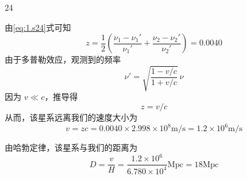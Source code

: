 \begin{solution}{24}
\begin{subsolution}
    \end{subsolution}
    \begin{subsolution}
        由\eqref{eq:1.s24}式可知
        \begin{equation}
            z = \frac{1}{2}\left(\frac{\nu_1 - \nu_1'}{\nu_1'} + \frac{\nu_2 - \nu_2'}{\nu_2'}\right) = 0.0040
            \label{eq:6.s24}
        \end{equation}
        由于多普勒效应，观测到的频率
        \begin{equation*}
            \nu' = \sqrt{\frac{1 - v/c}{1 + v/c}}\,\nu
        \end{equation*}
        因为 $v \ll c$，推导得
        \begin{equation*}
            z = v/c
        \end{equation*}
        从而，该星系远离我们的速度大小为
        \begin{equation}
            v = zc = 0.0040 \times 2.998 \times 10^8 \mathrm{m/s} = 1.2 \times 10^6 \mathrm{m/s}
            \label{eq:7.s24}
        \end{equation}
    \end{subsolution}
    \begin{subsolution}
        由哈勃定律，该星系与我们的距离为
        \begin{equation}
            D = \frac{v}{H} = \frac{1.2 \times 10^6}{6.780 \times 10^4}\mathrm{Mpc} = 18\mathrm{Mpc}
            \label{eq:8.s24}
        \end{equation}
    \end{subsolution}
\end{solution}